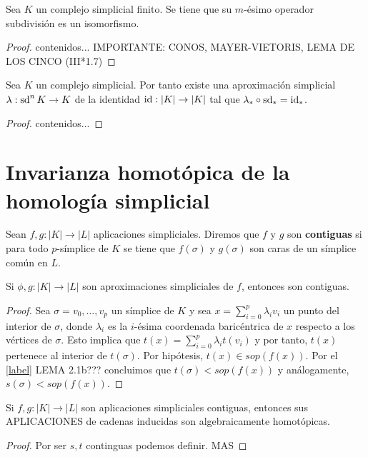 \begin{proposicion}
	Sea $K$ un complejo simplicial finito. Se tiene que su $m$-ésimo operador subdivisión es un isomorfismo.
\end{proposicion}
\begin{proof}
	contenidos... IMPORTANTE: CONOS, MAYER-VIETORIS, LEMA DE LOS CINCO (III*1.7)
\end{proof}

\begin{proposicion}
	Sea $K$ un complejo simplicial. Por tanto existe una aproximación simplicial $\lambda: \operatorname{sd}^n K \to K$ de la identidad $\operatorname{id}: |K| \to |K|$ tal que $\lambda_* \circ \operatorname{sd}_* = \operatorname{id}_*$.
\end{proposicion}
\begin{proof}
	contenidos...
\end{proof}

\section{Invarianza homotópica de la homología simplicial}
\begin{definicion}
	Sean $f,g : |K| \to |L|$ aplicaciones simpliciales. Diremos que $f$ y $g$ son \textbf{contiguas} si para todo $p$-símplice de $K$ se tiene que $f(\sigma)$ y $g(\sigma)$ son caras de un símplice común en $L$.
\end{definicion}
\begin{lema}
	Si $\phi,g : |K| \to |L|$ son aproximaciones simpliciales de $f$, entonces son contiguas.
\end{lema}
\begin{proof}
	Sea $\sigma = v_0, \dots, v_p$ un símplice de $K$ y sea $x = \sum_{i=0}^p \lambda_i v_i$ un punto del interior de $\sigma$, donde $\lambda_i$ es la $i$-ésima coordenada baricéntrica de $x$ respecto a los vértices de $\sigma$. Esto implica que $t(x) = \sum_{i=0}^p \lambda_i t(v_i)$ y por tanto, $t(x)$ pertenece al interior de $t(\sigma)$. Por hipótesis, $t(x) \in sop(f(x))$. Por el \autoref{label} LEMA 2.1b??? concluimos que $t(\sigma) < sop(f(x))$ y análogamente, $s(\sigma) < sop(f(x))$.
\end{proof}
\begin{lema}
	Si $f,g : |K| \to |L|$ son aplicaciones simpliciales contiguas, entonces sus APLICACIONES de cadenas inducidas son algebraicamente homotópicas.
\end{lema}
\begin{proof}
	Por ser $s,t$ continguas podemos definir. MAS
\end{proof}

